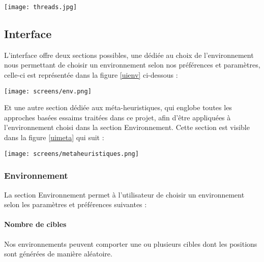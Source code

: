 	\noindent
	\begin{center}	  
		\captionsetup{width=0.8\linewidth}
		\texttt{[image: threads.jpg]}%
		\label{sim}%
	\end{center}
	

	\subsection{Interface}
	L'interface offre deux sections possibles, une dédiée au choix de l'environnement nous permettant de choisir un environnement selon nos préférences et paramètres, celle-ci est représentée dans la figure \ref{uienv} ci-dessous :
	
	\begin{center}	  
		\captionsetup{width=1\linewidth}
		\texttt{[image: screens/env.png]}%
		\vspace{-0.1 cm}
		\label{uienv}%
	\end{center}
	
	Et une autre section dédiée aux méta-heuristiques, qui englobe toutes les approches basées essaims traitées dans ce projet, afin d'être appliquées à l'environnement choisi dans la section Environnement. 
	Cette section est visible dans la figure \ref{uimeta} qui suit :
	
	\begin{center}	  
		\captionsetup{width=1\linewidth}
		\texttt{[image: screens/metaheuristiques.png]}%
		\vspace{-0.1 cm}
		\label{uimeta}%
	\end{center}
	
	\subsubsection{Environnement}
	La section Environnement permet à l'utilisateur de choisir un environnement selon les paramètres et préférences suivantes :
	
	
	
	\paragraph{Nombre de cibles}
	Nos environnements peuvent comporter une ou plusieurs cibles dont les positions sont générées de manière aléatoire.
	
